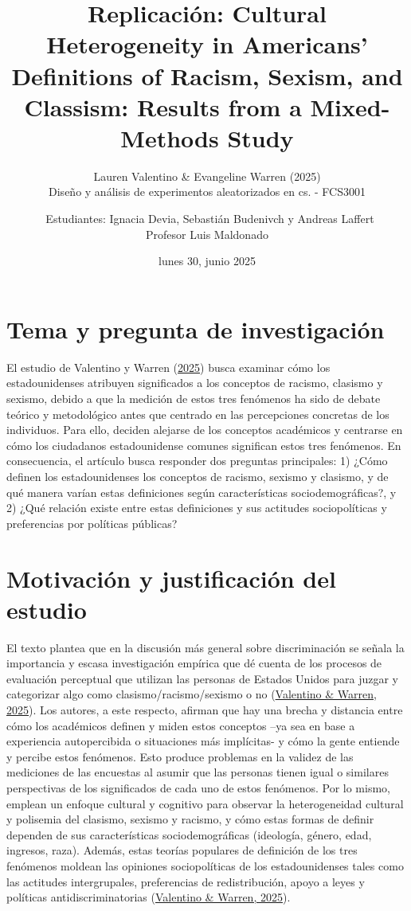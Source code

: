\documentclass[
  13pt,
  a4paper,
]{article}
\title{\vspace{2cm} Replicación: Cultural Heterogeneity in Americans' Definitions of Racism, Sexism, and Classism: Results from a Mixed-Methods Study}
\subtitle{Lauren Valentino \& Evangeline Warren (2025)\\
\vspace{2cm} Diseño y análisis de experimentos aleatorizados en cs. - FCS3001}
\author{~Estudiantes: Ignacia Devia, Sebastián Budenivch y Andreas Laffert\\
\hspace*{0.333em}Profesor Luis Maldonado\\
\vspace{7cm}}
\date{lunes 30, junio 2025}
\begin{document}
\maketitle

\pagebreak

\hypertarget{tema-y-pregunta-de-investigaciuxf3n}{%
\section{Tema y pregunta de investigación}\label{tema-y-pregunta-de-investigaciuxf3n}}

El estudio de Valentino y Warren (\protect\hyperlink{ref-valentino_cultural_2025}{2025}) busca examinar cómo los estadounidenses atribuyen significados a los conceptos de racismo, clasismo y sexismo, debido a que la medición de estos tres fenómenos ha sido de debate teórico y metodológico antes que centrado en las percepciones concretas de los individuos. Para ello, deciden alejarse de los conceptos académicos y centrarse en cómo los ciudadanos estadounidense comunes significan estos tres fenómenos. En consecuencia, el artículo busca responder dos preguntas principales: 1) ¿Cómo definen los estadounidenses los conceptos de racismo, sexismo y clasismo, y de qué manera varían estas definiciones según características sociodemográficas?, y 2) ¿Qué relación existe entre estas definiciones y sus actitudes sociopolíticas y preferencias por políticas públicas?

\hypertarget{motivaciuxf3n-y-justificaciuxf3n-del-estudio}{%
\section{Motivación y justificación del estudio}\label{motivaciuxf3n-y-justificaciuxf3n-del-estudio}}

El texto plantea que en la discusión más general sobre discriminación se señala la importancia y escasa investigación empírica que dé cuenta de los procesos de evaluación perceptual que utilizan las personas de Estados Unidos para juzgar y categorizar algo como clasismo/racismo/sexismo o no (\protect\hyperlink{ref-valentino_cultural_2025}{Valentino \& Warren, 2025}). Los autores, a este respecto, afirman que hay una brecha y distancia entre cómo los académicos definen y miden estos conceptos --ya sea en base a experiencia autopercibida o situaciones más implícitas- y cómo la gente entiende y percibe estos fenómenos. Esto produce problemas en la validez de las mediciones de las encuestas al asumir que las personas tienen igual o similares perspectivas de los significados de cada uno de estos fenómenos. Por lo mismo, emplean un enfoque cultural y cognitivo para observar la heterogeneidad cultural y polisemia del clasismo, sexismo y racismo, y cómo estas formas de definir dependen de sus características sociodemográficas (ideología, género, edad, ingresos, raza). Además, estas teorías populares de definición de los tres fenómenos moldean las opiniones sociopolíticas de los estadounidenses tales como las actitudes intergrupales, preferencias de redistribución, apoyo a leyes y políticas antidiscriminatorias (\protect\hyperlink{ref-valentino_cultural_2025}{Valentino \& Warren, 2025}).
\end{document}
